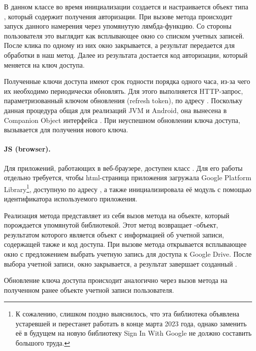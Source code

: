     В данном классе во время инициализации создается и настраивается объект типа , который содержит  получения авторизации. При вызове метода  происходит запуск данного намерения через упомянутую лямбда-функцию. Со стороны пользователя это выглядит как всплывающее окно со списком учетных записей. После клика по одному из них окно закрывается, а результат передается для обработки в наш метод. Далее из результата достается код авторизации, который меняется на ключ доступа.

    Полученные ключи доступа имеют срок годности порядка одного часа, из-за чего их необходимо периодически обновлять. Для этого выполняется HTTP-запрос, параметризованный ключом обновления (refresh token), по адресу . Поскольку данная процедура общая для реализаций JVM и Android, она вынесена в Companion Object интерфейса . При неуспешном обновлении ключа доступа, вызывается  для получения нового ключа.
    
    \paragraph{JS (browser).} Для приложений, работающих в веб-браузере, доступен класс . Для его работы отдельно требуется, чтобы html-страница приложения загружала Google Platform Library\footnote{К сожалению, слишком поздно выяснилось, что эта библиотека объявлена устаревшей и перестанет работать в конце марта 2023 года, однако заменить её в будущем на новую библиотеку Sign In With Google не должно составить большого труда.}, доступную по адресу , а также инициализировала её модуль  с помощью идентификатора используемого приложения. 

    Реализация метода  представляет из себя вызов метода  на объекте, который порождается упомянутой библиотекой. Этот метод возвращает -объект\cite{js-promise}, результатом которого является объект с информацией об учетной записи, содержащей также и код доступа. При вызове метода  открывается всплывающее окно с предложением выбрать учетную запись для доступа к Google Drive. После выбора учетной записи, окно закрывается, а результат завершает созданный .

    Обновление ключа доступа происходит аналогично через вызов метода  на полученном ранее объекте  учетной записи пользователя.

